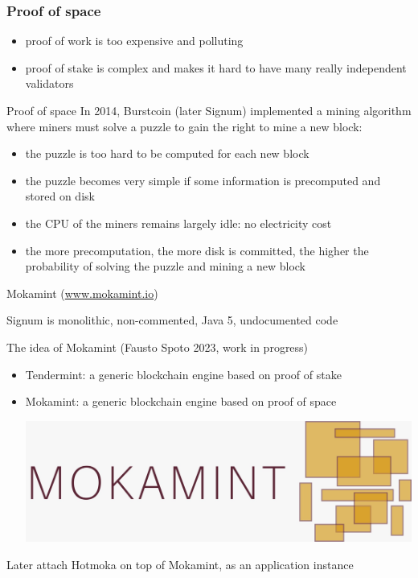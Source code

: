 \documentclass[11pt]{beamer}  %
\begin{document}
\begin{frame}\frametitle{Proof of space}

  \begin{itemize}
  \item proof of work is too expensive and polluting
  \item proof of stake is complex and makes it hard to have many really independent validators
  \end{itemize}

  \medskip

  \begin{greenbox}{Proof of space}
    In 2014, Burstcoin (later Signum) implemented a mining algorithm
    where miners must solve a puzzle to gain the right to mine a new block:
    \begin{itemize}
    \item the puzzle is too hard to be computed for each new block
    \item the puzzle becomes very simple if some information is precomputed and stored on disk
    \item the CPU of the miners remains largely idle: no electricity cost
    \item the more precomputation, the more disk is committed, the higher the probability of solving the puzzle and mining a new block
    \end{itemize}
  \end{greenbox}
  
\end{frame}

\begin{frame}{Mokamint (\url{www.mokamint.io})}

  Signum is monolithic, non-commented, Java 5, undocumented code

  \bigskip
  \bigskip

  \begin{greenbox}{The idea of Mokamint (Fausto Spoto 2023, work in progress)}
    \begin{itemize}
    \item Tendermint: a generic blockchain engine based on proof of stake
    \item Mokamint: a generic blockchain engine based on proof of space
      \begin{center}
        \includegraphics[scale=0.1,clip=false]{pictures/mokamint_colors.jpg}
      \end{center}
    \end{itemize}
  \end{greenbox}

  \bigskip

  Later attach Hotmoka on top of Mokamint, as an application instance

\end{frame}
\end{document}
